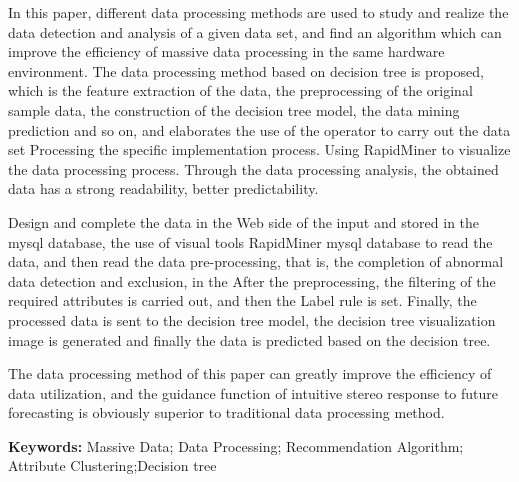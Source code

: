 In this paper, different data processing methods are used to study and realize the data detection and analysis of a given data set, and find an algorithm which can improve the efficiency of massive data processing in the same hardware environment. The data processing method based on decision tree is proposed, which is the feature extraction of the data, the preprocessing of the original sample data, the construction of the decision tree model, the data mining prediction and so on, and elaborates the use of the operator to carry out the data set Processing the specific implementation process. Using RapidMiner to visualize the data processing process. Through the data processing analysis, the obtained data has a strong readability, better predictability.

Design and complete the data in the Web side of the input and stored in the mysql database, the use of visual tools RapidMiner mysql database to read the data, and then read the data pre-processing, that is, the completion of abnormal data detection and exclusion, in the After the preprocessing, the filtering of the required attributes is carried out, and then the Label rule is set. Finally, the processed data is sent to the decision tree model, the decision tree visualization image is generated and finally the data is predicted based on the decision tree.

The data processing method of this paper can greatly improve the efficiency of data utilization, and the guidance function of intuitive stereo response to future forecasting is obviously superior to traditional data processing method.


\noindent 
\textbf{Keywords: }Massive Data; Data Processing; Recommendation Algorithm; Attribute Clustering;Decision tree
